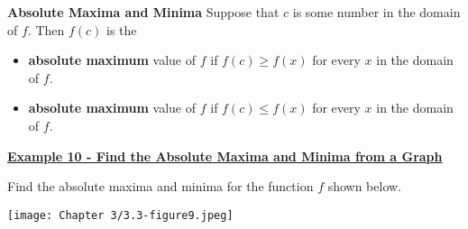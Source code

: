 \documentclass[12pt]{book}
\begin{document}
\begin{boxR}
    \textbf{Absolute Maxima and Minima}
    \vspace{1mm}
    \hline
    \vspace{2mm}
    Suppose that $c$ is some number in the domain of $f$. Then $f(c)$ is the
    \begin{itemize}
        \item \textbf{absolute maximum} value of $f$ if $f(c) \geq f(x)$ for every $x$ in the domain of $f$.
        \item \textbf{absolute maximum} value of $f$ if $f(c) \leq f(x)$ for every $x$ in the domain of $f$.
    \end{itemize}

\end{boxR}

\vspace{5mm}


\underline{\textbf{Example 10 - Find the Absolute Maxima and Minima from a Graph}}

Find the absolute maxima and minima for the function $f$ shown below. 

\texttt{[image: Chapter 3/3.3-figure9.jpeg]}
\end{document}
